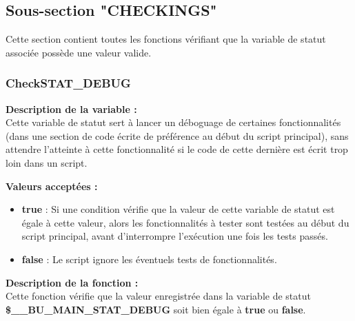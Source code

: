 \documentclass[a4paper,10pt]{article}
\begin{document}
\color{green}
\subsection{Sous-section "CHECKINGS"}\color{white}

\begin{justify}
    Cette section contient toutes les fonctions vérifiant que la variable de statut associée possède une valeur valide.
\end{justify}

\color{blue}
\subsubsection{CheckSTAT\_DEBUG}\color{white}

\begin{justify}
    \textbf{Description de la variable :}\\
    Cette variable de statut sert à lancer un déboguage de certaines fonctionnalités (dans une section de code écrite de préférence au début du script principal), sans attendre l'atteinte à cette fonctionnalité si le code de cette dernière est écrit trop loin dans un script.
\end{justify}

\begin{justify}
    \textbf{Valeurs acceptées :}

    \begin{itemize}
        \item \textbf{true} : Si une condition vérifie que la valeur de cette variable de statut est égale à cette valeur, alors les fonctionnalités à tester sont testées au début du script principal, avant d'interrompre l'exécution une fois les tests passés.\\

        \item \textbf{false} : Le script ignore les éventuels tests de fonctionnalités.
    \end{itemize}
\end{justify}

\begin{justify}
    \textbf{Description de la fonction :}\\
    Cette fonction vérifie que la valeur enregistrée dans la variable de statut \textbf{\color{orange}\$\_\_BU\_MAIN\_STAT\_DEBUG} soit bien égale à \textbf{true} ou \textbf{false}.\\[1\baselineskip]
\end{justify}
\end{document}
